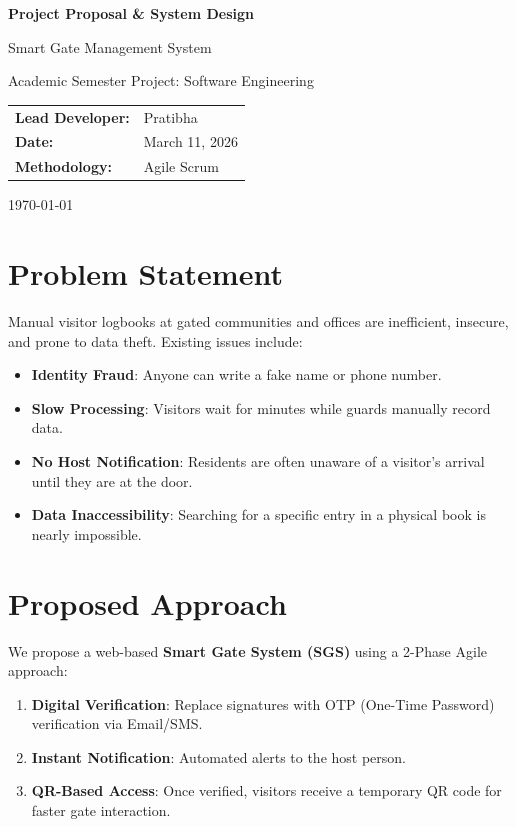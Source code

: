 \documentclass[12pt,a4paper]{article}
\begin{document}
\begin{titlepage}
    \centering
    \scshape
    \vspace*{1cm}
    {\huge\bfseries Project Proposal \& System Design\par}
    \vspace{0.5cm}
    {\Large Smart Gate Management System\par}
    \vspace{1.5cm}
    {\large Academic Semester Project: Software Engineering\par}
    \vspace{2cm}
    
    \begin{table}[h]
        \centering
        \begin{tabular}{ll}
            \textbf{Lead Developer:} & Pratibha \\
            \textbf{Date:} & March 11, 2026 \\
            \textbf{Methodology:} & Agile Scrum
        \end{tabular}
    \end{table}

    \vfill
    {\large \today\par}
\end{titlepage}

\tableofcontents
\newpage

\section{Problem Statement}
Manual visitor logbooks at gated communities and offices are inefficient, insecure, and prone to data theft. Existing issues include:
\begin{itemize}
    \item \textbf{Identity Fraud}: Anyone can write a fake name or phone number.
    \item \textbf{Slow Processing}: Visitors wait for minutes while guards manually record data.
    \item \textbf{No Host Notification}: Residents are often unaware of a visitor's arrival until they are at the door.
    \item \textbf{Data Inaccessibility}: Searching for a specific entry in a physical book is nearly impossible.
\end{itemize}

\section{Proposed Approach}
We propose a web-based \textbf{Smart Gate System (SGS)} using a 2-Phase Agile approach:
\begin{enumerate}
    \item \textbf{Digital Verification}: Replace signatures with OTP (One-Time Password) verification via Email/SMS.
    \item \textbf{Instant Notification}: Automated alerts to the host person.
    \item \textbf{QR-Based Access}: Once verified, visitors receive a temporary QR code for faster gate interaction.
\end{enumerate}
\end{document}
